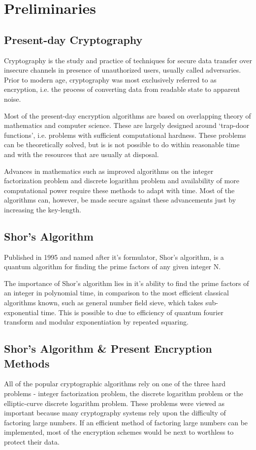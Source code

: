 \chapter{Preliminaries}
\label{chap:prelim}

\section{Present-day Cryptography}
Cryptography is the  study and practice of techniques for secure data transfer over insecure channels in presence of unauthorized users, usually called adversaries. Prior to modern age, cryptography was most exclusively referred to as encryption, i.e. the process of converting data from readable state to apparent noise.

Most of the present-day encryption algorithms are based on overlapping theory of mathematics and computer science. These are largely designed around `trap-door functions', i.e. problems with sufficient computational hardness. These problems can be theoretically solved, but is is not possible to do within reasonable time and with the resources that are usually at disposal.

Advances in mathematics such as improved algorithms on the integer factorization problem and discrete logarithm problem and availability of more computational power require these methods to adapt with time. Most of the algorithms can, however, be made secure against these advancements just by increasing the key-length.

\section{Shor's Algorithm}
Published in 1995 and named after it's formulator, Shor's algorithm, is a quantum algorithm for finding the prime factors of any given integer N.

The importance of Shor's algorithm lies in it's ability to find the prime factors of an integer in polynomial time, in comparison to the most efficient classical algorithms known, such as general number field sieve, which takes sub-exponential time. This is possible to due to efficiency of quantum fourier transform and modular exponentiation by repeated squaring.

\section{Shor's Algorithm \& Present Encryption Methods}
All of the popular cryptographic algorithms rely on one of the three hard problems - integer factorization problem, the discrete logarithm problem or the elliptic-curve discrete logarithm problem. These problems were viewed as important because many cryptography systems rely upon the difficulty of factoring large numbers. If an efficient method of factoring large numbers can be implemented, most of the encryption schemes would be next to worthless to protect their data. 

